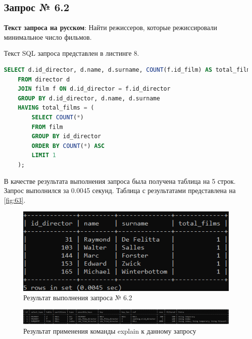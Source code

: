 \documentclass[11pt,a4paper,final]{article} %
\begin{document}
\subsection{Запрос № 6.2}

\par \textbf{Текст запроса на русском}: Найти режиссеров, которые режиссировали минимальное число фильмов. 
\par Текст SQL запроса представлен в листинге 8.

\begin{lstlisting}[caption=SQL запрос № 6.2, language=SQL]
    SELECT d.id_director, d.name, d.surname, COUNT(f.id_film) AS total_films
    FROM director d
    JOIN film f ON d.id_director = f.id_director
    GROUP BY d.id_director, d.name, d.surname
    HAVING total_films = (
        SELECT COUNT(*)
        FROM film
        GROUP BY id_director
        ORDER BY COUNT(*) ASC
        LIMIT 1
    );
\end{lstlisting}


\par В качестве результата выполнения запроса была получена таблица на 5 строк. Запрос выполнился за 0.0045 секунд. Таблица с результатами представлена на \autoref{fig:63}.

\begin{figure}[H]
	\centering
	\includegraphics[width=0.7\linewidth]{63.png}
	\caption{Результат выполнения запроса № 6.2}
	\label{fig:63}
\end{figure}


\begin{figure}[H]
	\centering
	\includegraphics[width=1.0\linewidth]{e62.png}
	\caption{Результат применения команды explain к данному запросу}
	\label{fig:e62}
\end{figure}
\end{document}
